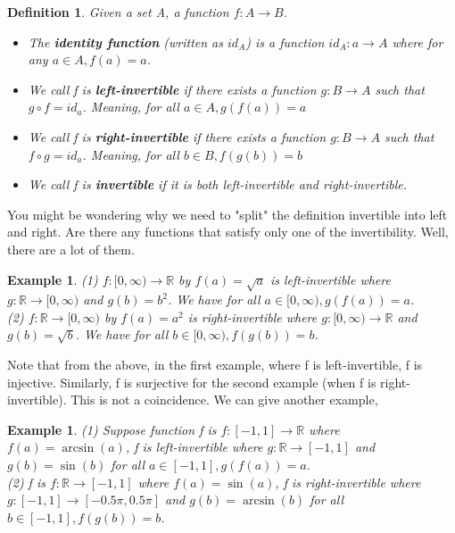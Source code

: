 \documentclass{book}
\newtheorem{definition}[theorem]{Definition}
\newtheorem{example}[theorem]{Example}
\begin{document}
\begin{definition}
    Given a set A, a function $f : A \rightarrow B$.
    \begin{itemize}[itemsep = 0pt]
        \item[(1)] The \textbf{identity function} (written as $id_{A}$) is a function $id_{A} : a \rightarrow A$ where for any $a \in A, f(a) = a$. 
        \item[(2)] We call f is \textbf{left-invertible} if there exists a function $g : B \rightarrow A$ such that $g \circ f = id_{a}$. Meaning, for all $a \in A, g(f(a)) = a$
        \item[(3)] We call f is \textbf{right-invertible} if there exists a function $g : B \rightarrow A$ such that $f \circ g = id_{a}$. Meaning, for all $b \in B, f(g(b)) = b$
        \item[(4)] We call f is \textbf{invertible} if it is both left-invertible and right-invertible.
    \end{itemize}
\end{definition}

You might be wondering why we need to "split" the definition invertible into left and right. Are there any functions that satisfy only one of the invertibility. Well, there are a lot of them.

\begin{example}
    (1) $f : [0, \infty) \rightarrow \mathbb{R}$ by $f(a) = \sqrt{a}$ is left-invertible where $g : \mathbb{R} \rightarrow [0, \infty)$ and $g(b) = b^{2}$. We have for all $a \in [0, \infty), g(f(a)) = a$. \\
    \indent (2) $f : \mathbb{R} \rightarrow [0, \infty)$ by $f(a) = a^{2}$ is right-invertible where $g : [0, \infty) \rightarrow \mathbb{R}$ and $g(b) = \sqrt{b}$. We have for all $b \in [0, \infty), f(g(b)) = b$.
\end{example}

Note that from the above, in the first example, where f is left-invertible, f is injective. Similarly, f is surjective for the second example (when f is right-invertible). This is not a coincidence. We can give another example,

\begin{example}
    (1) Suppose function f is $f : [-1, 1] \rightarrow \mathbb{R}$ where $f(a) = \arcsin(a)$, f is left-invertible where $g : \mathbb{R} \rightarrow [-1, 1]$ and $g(b) = \sin(b)$ for all $a \in [-1, 1], g(f(a)) = a$. \\
    \indent (2) f is $f : \mathbb{R} \rightarrow [-1, 1]$ where $f(a) = \sin(a)$, f is right-invertible where $g : [-1, 1] \rightarrow [-0.5\pi, 0.5\pi]$ and $g(b) = \arcsin(b)$ for all $b \in [-1, 1], f(g(b)) = b$.
\end{example}
\end{document}
